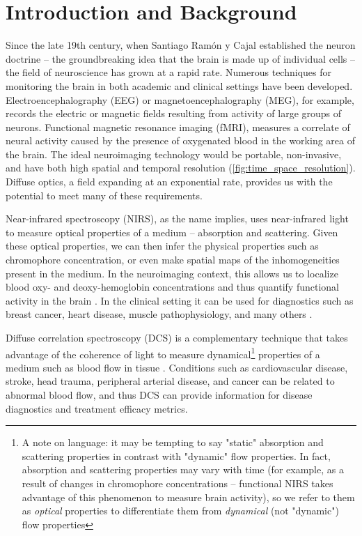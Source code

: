 \chapter{Introduction and Background} \label{sec:Chapter1}

Since the late 19th century, when Santiago Ram{\'o}n y Cajal established the neuron doctrine -- the groundbreaking idea that the brain is made up of individual cells -- the field of neuroscience has grown at a rapid rate. Numerous techniques for monitoring the brain in both academic and clinical settings have been developed. Electroencephalography (EEG) or magnetoencephalography (MEG), for example, records the electric or magnetic fields resulting from activity of large groups of neurons. Functional magnetic resonance imaging (fMRI), measures a correlate of neural activity caused by the presence of oxygenated blood in the working area of the brain. The ideal neuroimaging technology would be portable, non-invasive, and have both high spatial and temporal resolution (\autoref{fig:time_space_resolution}). Diffuse optics, a field expanding at an exponential \cite{Boas2014} rate, provides us with the potential to meet many of these requirements.

Near-infrared spectroscopy (NIRS), as the name implies, uses near-infrared light to measure optical properties of a medium -- absorption and scattering. Given these optical properties, we can then infer the physical properties such as chromophore concentration, or even make spatial maps of the inhomogeneities present in the medium. In the neuroimaging context, this allows us to localize blood oxy- and deoxy-hemoglobin concentrations and thus quantify functional activity in the brain \cite{Boas2014, Scholkmann2014}. In the clinical setting it can be used for diagnostics such as breast cancer, heart disease, muscle pathophysiology, and many others \cite{Sakudo2016}.

Diffuse correlation spectroscopy (DCS) is a complementary technique that takes advantage of the coherence of light to measure dynamical\footnote{A note on language: it may be tempting to say "static" absorption and scattering properties in contrast with "dynamic" flow properties. In fact, absorption and scattering properties may vary with time (for example, as a result of changes in chromophore concentrations -- functional NIRS \cite{Boas2014, Scholkmann2014} takes advantage of this phenomenon to measure brain activity), so we refer to them as \emph{optical} properties to differentiate them from \emph{dynamical} (not "dynamic") flow properties} properties of a medium such as blood flow in tissue \cite{Durduran2014, Buckley2014}. Conditions such as cardiovascular disease, stroke, head trauma, peripheral arterial disease, and cancer can be related to abnormal blood flow, and thus DCS can provide information for disease diagnostics and treatment efficacy metrics.

